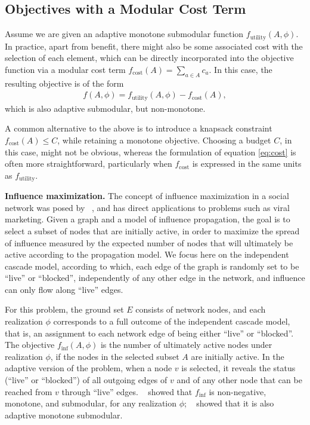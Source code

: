 \documentclass{article}
\newcommand{\citet}[1]{\citeauthor{#1}~\shortcite{#1}}
\renewcommand{\paragraph}[1]{\vspace{0.3em}\noindent\textbf{#1.}\makebox[0.5em]{}}
\begin{document}
\subsection{Objectives with a Modular Cost Term}
Assume we are given an adaptive monotone submodular function $f_{\textrm{utility}}(A, \phi)$.
In practice, apart from benefit, there might also be some associated cost with the selection of each element, which can be directly incorporated into the objective function via a modular  cost term $f_{\textrm{cost}}(A) = \sum_{a \in A} c_a$.
In this case, the resulting objective is of the form
\begin{align} \label{eq:cost}
  f(A, \phi) = f_{\textrm{utility}}(A, \phi) - f_{\textrm{cost}}(A),
\end{align}
which is also adaptive submodular, but non-monotone.

A common alternative to the above is to introduce a knapsack constraint $f_{\textrm{cost}}(A) \leq C$, while retaining a monotone objective.
Choosing a budget $C$, in this case, might not be obvious, whereas the formulation of equation \eqref{eq:cost} is often more straightforward, particularly when $f_{\textrm{cost}}$ is expressed in the same units as $f_{\textrm{utility}}$.

\paragraph{Influence maximization}
The concept of influence maximization in a social network was posed by \citet{kempe03}, and has direct applications to problems such as viral marketing.
Given a graph and a model of influence propagation, the goal is to select a subset of nodes that are initially active, in order to maximize the spread of influence measured by the expected number of nodes that will ultimately be active according to the propagation model.
We focus here on the independent cascade model, according to which, each edge of the graph is randomly set to be ``live'' or ``blocked'', independently of any other edge in the network, and influence can only flow along ``live'' edges.

For this problem, the ground set $E$ consists of network nodes, and each realization $\phi$ corresponds to a full outcome of the independent cascade model, that is, an assignment to each network edge of being either ``live'' or ``blocked''.
The objective $f_{\textrm{inf}}(A, \phi)$ is the number of ultimately active nodes under realization $\phi$, if the nodes in the selected subset $A$ are initially active.
In the adaptive version of the problem, when a node $v$ is selected, it reveals the status (``live'' or ``blocked'') of all outgoing edges of $v$ and of any other node that can be reached from $v$ through ``live'' edges.
\citet{kempe03} showed that $f_{\textrm{inf}}$ is non-negative, monotone, and submodular, for any realization $\phi$; \citet{golovin11} showed that it is also adaptive monotone submodular.
\end{document}
